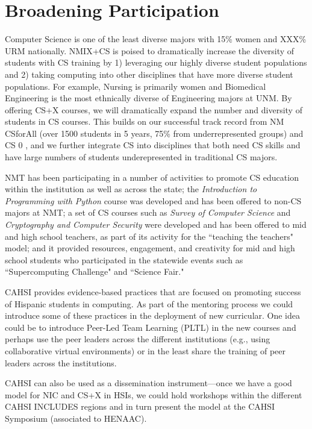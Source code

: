 \section{Broadening Participation}
Computer Science is one of the least diverse majors with 15\% women and XXX\% URM nationally. NMIX+CS is poised to dramatically increase the diversity of students with CS training by 1) leveraging our highly diverse student populations and 2) taking computing into other disciplines that have more diverse student populations. For example, Nursing is primarily women and Biomedical Engineering is the most ethnically diverse of Engineering majors at UNM. By offering CS+X courses, we will dramatically expand the number and diversity of students in CS courses. This builds on our successful track record from NM CSforAll (over 1500 students in 5 years, 75\% from underrepresented groups) and CS 0 , and we further integrate CS into disciplines that both need CS skills and have large numbers of students underepresented in traditional CS majors.


NMT has been participating in a number of activities to promote CS education within the institution as well as across the state; the \textit{Introduction to Programming with Python} course was developed and has been offered to non-CS majors at NMT; a set of CS courses such as \textit{Survey of Computer Science} and \textit{Cryptography and Computer Security} were developed and has been offered to mid and high school teachers, as part of its activity for the ``teaching the teachers" model; and it provided resources, engagement, and creativity for mid and high school students who participated in the statewide events such as ``Supercomputing Challenge" and ``Science Fair." 

CAHSI provides evidence-based practices that are focused on promoting success of Hispanic students in computing. As part of the mentoring process we could introduce some of these practices in the deployment of new curricular. One idea could be to introduce Peer-Led Team Learning (PLTL) in the new courses and perhaps use the peer leaders across the different institutions (e.g., using collaborative virtual environments) or in the least share the training of peer leaders across the institutions. 

CAHSI can also be used as a dissemination instrument---once we have a good model for NIC and CS+X in HSIs, we could hold workshops within the different CAHSI INCLUDES regions and in turn present the model at the CAHSI Symposium (associated to HENAAC).
